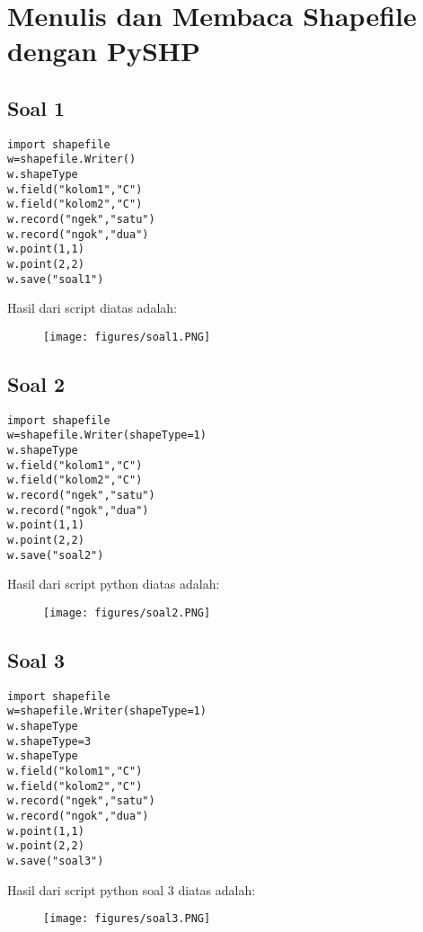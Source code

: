 \chapter{Menulis dan Membaca Shapefile dengan PySHP}
\section{Soal 1}
\begin{verbatim}
import shapefile
w=shapefile.Writer()
w.shapeType
w.field("kolom1","C")
w.field("kolom2","C")
w.record("ngek","satu")
w.record("ngok","dua")
w.point(1,1)
w.point(2,2)
w.save("soal1")
\end{verbatim}

\par Hasil dari script diatas adalah: 
\begin{figure}[!htbp]
    \centering
    \texttt{[image: figures/soal1.PNG]}
    \label{soal1}
\end{figure}

\section{Soal 2}
\begin{verbatim}
import shapefile
w=shapefile.Writer(shapeType=1)
w.shapeType
w.field("kolom1","C")
w.field("kolom2","C")
w.record("ngek","satu")
w.record("ngok","dua")
w.point(1,1)
w.point(2,2)
w.save("soal2")
\end{verbatim}

\par Hasil dari script python diatas adalah:
\begin{figure}[!htbp]
    \centering
    \texttt{[image: figures/soal2.PNG]}
    \label{soal2}
\end{figure}

\section{Soal 3}
\begin{verbatim}
import shapefile
w=shapefile.Writer(shapeType=1)
w.shapeType
w.shapeType=3
w.shapeType
w.field("kolom1","C")
w.field("kolom2","C")
w.record("ngek","satu")
w.record("ngok","dua")
w.point(1,1)
w.point(2,2)
w.save("soal3")
\end{verbatim}

\par Hasil dari script python soal 3 diatas adalah: 
\begin{figure}[!htbp]
    \centering
    \texttt{[image: figures/soal3.PNG]}
    \label{soal3}
\end{figure}

